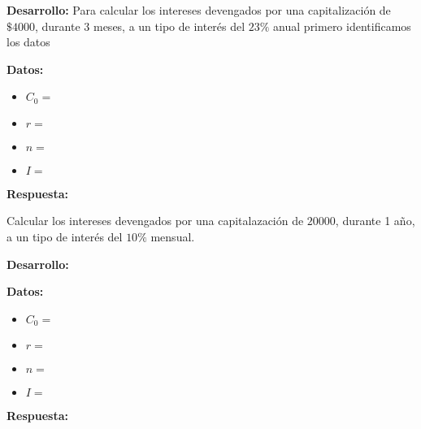 \documentclass[12pt]{examdesign}
\theoremstyle{plain}
\theoremstyle{definition}
\theoremstyle{remark}
\begin{document}
\begin{shortanswer}[title={Leemos el material de consulta y realizamos las actividades propuestas.}, rearrange=no]
\begin{question}
        	\begin{answer}
        		\textbf{Desarrollo:} Para calcular los intereses devengados por una capitalización de $\$4000$, durante 3 meses, a un tipo de interés del $23\%$ anual primero identificamos los datos
        		
        		\textbf{Datos:}
        		\begin{itemize}
        			\item $C_{0}=$
        			\item $r=$
        			\item $n=$
        			\item $I=$
        		\end{itemize}
        	
        	    \textbf{Respuesta:}
        	\end{answer}
        \end{question}
    
        \begin{question}
        	Calcular los intereses devengados por una capitalazación de $20000$, durante 1 año, a un tipo de interés del $10\%$ mensual.
        	
        	\begin{answer}
        		\textbf{Desarrollo:}
        		
        		\textbf{Datos:}
        		\begin{itemize}
        			\item $C_{0}=$
        			\item $r=$
        			\item $n=$
        			\item $I=$
        		\end{itemize}
        	
        	    \textbf{Respuesta:}
        	\end{answer}
        \end{question}
    \end{shortanswer}
\end{document}
